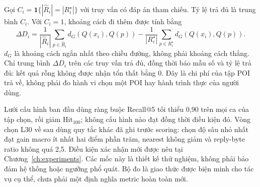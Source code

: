 Gọi $C_i=\mathbf1\{|\widehat R_i|=|R_i^\star|\}$ với truy vấn có đáp án tham chiếu. Tỷ lệ trả đủ là trung bình $C_i$. Với $C_i=1$, khoảng cách đi thêm được tính bằng
\[
\Delta D_i=\frac{1}{|\widehat R_i|}\sum_{p\in\widehat R_i}d_G(Q(x_i),Q(p))
-\frac{1}{|R_i^\star|}\sum_{p\in R_i^\star}d_G(Q(x_i),Q(p)).
\]
$d_G$ là khoảng cách ngắn nhất theo chiều đường, không phải khoảng cách thẳng. Chỉ trung bình $\Delta D_i$ trên các truy vấn trả đủ, đồng thời báo mẫu số và tỷ lệ trả đủ: kết quả rỗng không được nhận tổn thất bằng 0. Đây là chi phí của tập POI trả về, không phải đo hành vi chọn một POI hay hành trình thực của người dùng.

Lưới cấu hình ban đầu dùng ràng buộc Recall@5 tối thiểu 0,90 trên mọi ca của tập chọn, rồi giảm Hit$_{100}$; không cấu hình nào đạt đồng thời điều kiện đó. Vòng chọn L30 về sau dùng quy tắc khác đã ghi trước scoring: chọn độ sâu nhỏ nhất đạt gain macro ít nhất hai điểm phần trăm, nearest không giảm và reply-byte ratio không quá 2,5. Điều kiện xác nhận mới được nêu tại Chương~\ref{ch:experiments}. Các mốc này là thiết kế thử nghiệm, không phải bảo đảm hệ thống hoặc ngưỡng phổ quát. Bộ đo là giao thức được biện minh cho tác vụ cụ thể, chưa phải một định nghĩa metric hoàn toàn mới.
